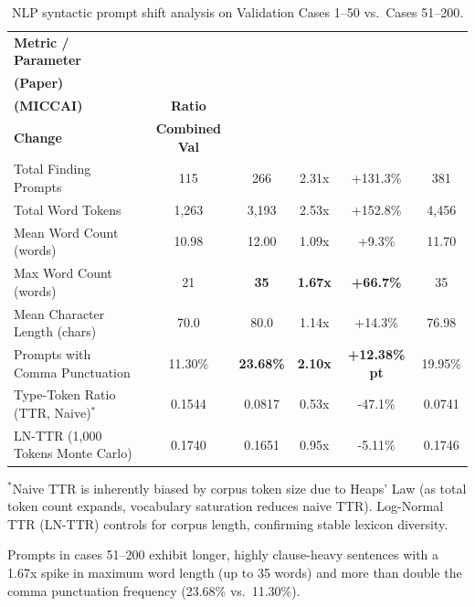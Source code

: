 \documentclass[11pt,a4paper]{article}
\begin{document}
\begin{table}[htbp]
\centering
\caption{NLP syntactic prompt shift analysis on Validation Cases 1--50 vs.\ Cases 51--200.}
\label{tab:nlp_shift}
\scriptsize
\setlength{\tabcolsep}{3.0pt}
\begin{tabularx}{\linewidth}{>{\raggedright\arraybackslash}Xccccc}
\toprule
\textbf{Metric / Parameter} & \makecell{\textbf{Cases 1--50}\\\textbf{(Paper)}} & \makecell{\textbf{Cases 51--200}\\\textbf{(MICCAI)}} & \textbf{Ratio} & \makecell{\textbf{Percentage}\\\textbf{Change}} & \textbf{Combined Val} \\
\midrule
Total Finding Prompts & 115 & 266 & 2.31x & +131.3\% & 381 \\
Total Word Tokens & 1,263 & 3,193 & 2.53x & +152.8\% & 4,456 \\
Mean Word Count (words) & 10.98 & 12.00 & 1.09x & +9.3\% & 11.70 \\
Max Word Count (words) & 21 & \textbf{35} & \textbf{1.67x} & \textbf{+66.7\%} & 35 \\
Mean Character Length (chars) & 70.0 & 80.0 & 1.14x & +14.3\% & 76.98 \\
Prompts with Comma Punctuation & 11.30\% & \textbf{23.68\%} & \textbf{2.10x} & \textbf{+12.38\% pt} & 19.95\% \\
Type-Token Ratio (TTR, Naive)$^*$ & 0.1544 & 0.0817 & 0.53x & -47.1\% & 0.0741 \\
LN-TTR (1,000 Tokens Monte Carlo) & 0.1740 & 0.1651 & 0.95x & -5.11\% & 0.1746 \\
\bottomrule
\end{tabularx}

\vspace{2mm}
\raggedright \scriptsize $^*$Naive TTR is inherently biased by corpus token size due to Heaps' Law (as total token count expands, vocabulary saturation reduces naive TTR). Log-Normal TTR (LN-TTR) controls for corpus length, confirming stable lexicon diversity.
\end{table}

Prompts in cases 51--200 exhibit longer, highly clause-heavy sentences with a 1.67x spike in maximum word length (up to 35 words) and more than double the comma punctuation frequency (23.68\% vs.\ 11.30\%).
\end{document}

